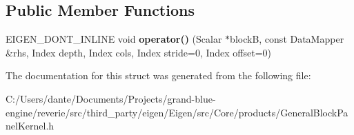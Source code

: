 \subsection*{Public Member Functions}
\begin{DoxyCompactItemize}
\item 
\mbox{\label{struct_eigen_1_1internal_1_1gemm__pack__rhs_3_01_scalar_00_01_index_00_01_data_mapper_00_01nr_00e5afdbaca90e394aa6e3c7b4d02529b6_adecc1d0ef7d3a37b141ab64bd56feaf0}} 
E\+I\+G\+E\+N\+\_\+\+D\+O\+N\+T\+\_\+\+I\+N\+L\+I\+NE void {\bfseries operator()} (Scalar $\ast$blockB, const Data\+Mapper \&rhs, Index depth, Index cols, Index stride=0, Index offset=0)
\end{DoxyCompactItemize}


The documentation for this struct was generated from the following file\+:\begin{DoxyCompactItemize}
\item 
C\+:/\+Users/dante/\+Documents/\+Projects/grand-\/blue-\/engine/reverie/src/third\+\_\+party/eigen/\+Eigen/src/\+Core/products/General\+Block\+Panel\+Kernel.\+h\end{DoxyCompactItemize}
